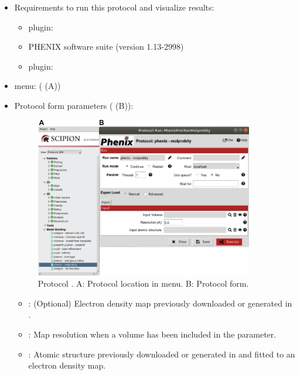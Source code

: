 \begin{itemize}
 \item Requirements to run this protocol and visualize results:
    \begin{itemize}
        \item \scipion plugin: 
        \item PHENIX software suite (version 1.13-2998)
        \item \scipion plugin: 
    \end{itemize}
 \item \scipion menu:
   ( (A))
  
 \item Protocol form parameters ( (B)):
  
    \begin{figure}[H]
     \centering 
     \captionsetup{width=.7\linewidth} 
     \includegraphics[width=0.90\textwidth]{Images_appendix/Fig143.pdf}
     \caption{Protocol . A: Protocol location in \scipion menu. B: Protocol form.}
     \label{fig:app_protocol_molprobity_1}
    \end{figure}

    \begin{itemize}
     \item {}: (Optional) Electron density map previously downloaded or generated in \scipion.
     \item {}: Map resolution when a volume has been included in the  parameter.
     \item {}: Atomic structure previously downloaded or generated in \scipion and fitted to an electron density map.
    \end{itemize}
    

\end{itemize}
